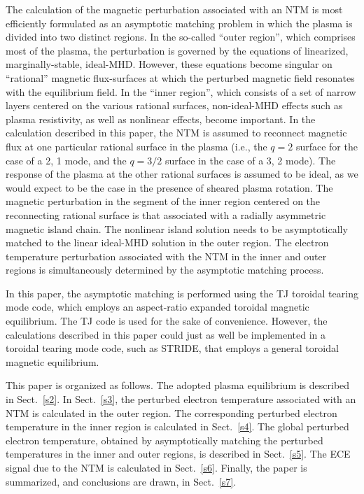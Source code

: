 \documentclass[12pt,prb,aps]{revtex4-1}
\begin{document}
The calculation of the  magnetic perturbation associated with an NTM is most efficiently formulated as an asymptotic matching problem in which the  plasma is  divided into two distinct regions.\cite{tear1,tear2,tear3,tear4,tear5,tear6,tear7,tear8,tear9,tear10}    In the so-called ``outer region'', which comprises most
of the plasma, the perturbation is governed by the equations of linearized, marginally-stable, ideal-MHD.
However, these equations become singular on   ``rational'' magnetic flux-surfaces at which the perturbed magnetic field resonates with the equilibrium field. In the ``inner region'', which
consists of a set of narrow layers centered on the various rational surfaces, non-ideal-MHD effects such as plasma resistivity, as well as nonlinear effects,  become important. 
 In the calculation described in this paper, the NTM is assumed to reconnect magnetic flux at one particular rational surface in the plasma (i.e., the
 $q=2$ surface for the case of a 2, 1 mode, and the $q=3/2$ surface in the case of a 3, 2 mode). The response of the plasma at the
 other rational surfaces is assumed to be ideal, as we would expect to be the case in the presence of sheared plasma rotation.\cite{tear5}
The magnetic perturbation in the segment of the inner region centered on the reconnecting rational surface is that associated with a radially asymmetric magnetic island chain.\cite{ntm1,island}
The nonlinear island solution needs to be asymptotically matched to the linear ideal-MHD solution in the outer region. The
electron temperature perturbation associated with the NTM in the inner and outer regions is simultaneously  determined by the asymptotic matching process. 

In this paper, the asymptotic matching is performed using the TJ toroidal tearing mode code,\cite{tear9,tear10}  which employs an aspect-ratio
expanded toroidal magnetic equilibrium.\cite{exp} The TJ code is used for the sake of convenience. However, the calculations described in this paper
could just as well be implemented in a toroidal tearing mode code, such as STRIDE,\cite{tear7,tear8} that employs a general toroidal magnetic 
equilibrium. 

This paper is organized as follows. The adopted plasma equilibrium is described in Sect.~\ref{s2}.  In Sect.~\ref{s3}, the perturbed electron temperature associated with  an NTM is calculated in the outer region. The corresponding perturbed electron temperature  in the inner region is calculated in Sect.~\ref{s4}. The
global perturbed electron temperature, obtained by asymptotically matching the perturbed temperatures  in  the inner and outer regions, is
described in Sect.~\ref{s5}. The ECE signal due to the NTM is calculated in Sect.~\ref{s6}. Finally, the paper is summarized, and
conclusions are drawn, in Sect.~\ref{s7}. 
\end{document}
